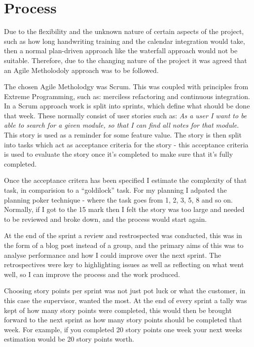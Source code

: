 \section{Process}
Due to the flexibility and the unknown nature of certain aspects of the project, such as how long handwriting training and the calendar integration would take, then a normal plan-driven approach like the waterfall approach would not be suitable. Therefore, due to the changing nature of the project it was agreed that an Agile Metholodoly approach was to be followed.

The chosen Agile Metholodgy was Scrum. This was coupled with principles from Extreme Programming, such as: merciless refactoring and continuous integration. In a Scrum approach work is split into sprints, which define what should be done that week. These normally consist of user stories such as: \textit{As a user I want to be able to search for a given module, so that I can find all notes for that module}. This story is used as a reminder for some feature value. The story is then split into tasks which act as acceptance criteria for the story - this acceptance criteria is used to evaluate the story once it's completed to make sure that it's fully completed.

Once the acceptance critera has been specified I estimate the complexity of that task, in comparision to a ``goldilock'' task.  For my planning I adpated the planning poker technique - where the task goes from 1, 2, 3, 5, 8 and so on. Normally, if I got to the 15 mark then I felt the story was too large and needed to be reviewed and broke down, and the process would start again.

At the end of the sprint a review and restrospected was conducted, this was in the form of a blog post instead of a group, and the primary aims of this was to analyse performance and how I could improve over the next sprint. The retrospectives were key to highlighting issues as well as reflecting on what went well, so I can improve the process and the work produced.

Choosing story points per sprint was not just pot luck or what the customer, in this case the supervisor, wanted the most. At the end of every sprint a tally was kept of how many story points were completed, this would then be brought forward to the next sprint as how many story points should be completed that week. For example, if you completed 20 story points one week your next weeks estimation would be 20 story points worth.



